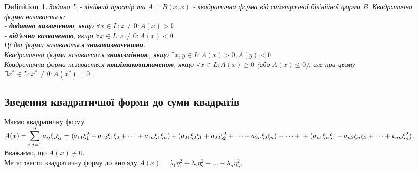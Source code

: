 \documentclass[a4paper, 10pt]{article}
\def\huge{\displaystyle}
\theoremstyle{theoremdd}
\theoremstyle{theoremdd}
\newtheorem{definition}[theorem]{Definition}
\theoremstyle{theoremdd}
\theoremstyle{theoremdd}
\theoremstyle{theoremdd}
\theoremstyle{theoremdd}
\theoremstyle{theoremdd}
\theoremstyle{theoremdd}
\begin{document}
\begin{definition}
Задано $L$ - лінійний простір та $A = B(x,x)$ - квадратична форма від симетричної білінійної форми $B$. Квадратична форма називається:\\
- \textbf{додатно визначеною}, якщо $\forall x \in L: x \neq 0: A(x) > 0$\\
- \textbf{від'ємно визначеною}, якщо $\forall x \in L: x \neq 0: A(x) < 0$\\
Ці дві форми називаються \textbf{знаковизначеними}.
\bigskip \\
Квадратична форма називається \textbf{знакозмінною}, якщо $\exists x,y \in L: A(x) >0, A(y) < 0$\\
Квадратична форма називається \textbf{квазізнаковизначеною}, якщо $\forall x \in L: A(x) \geq 0$ (або $A(x) \leq 0$), але при цьому $\exists x^* \in L: x^* \neq 0: A(x^*) = 0$.
\end{definition}

\subsection{Зведення квадратичної форми до суми квадратів}
Маємо квадратичну форму \\ $A(x) = \huge\sum_{i,j=1}^n a_{ij} \xi_i \xi_j = (a_{11}\xi_1^2 + a_{12}\xi_1\xi_2 + \dots + a_{1n}\xi_1 \xi_n) + (a_{21}\xi_2\xi_1 + a_{22}\xi_2^2 + \dots + a_{2n}\xi_2 \xi_n) + \dots + \\ +
(a_{n1}\xi_n \xi_1 + a_{n2}\xi_n\xi_2 + \dots + a_{nn}\xi_n^2)$. Вважаємо, що $A(x) \not\equiv 0$. \\
Мета: звести квадратичну форму до вигляду $A(x) = \lambda_1 \eta_1^2 + \lambda_2 \eta_2^2 + \dots + \lambda_n \eta_n^2$.
\end{document}
